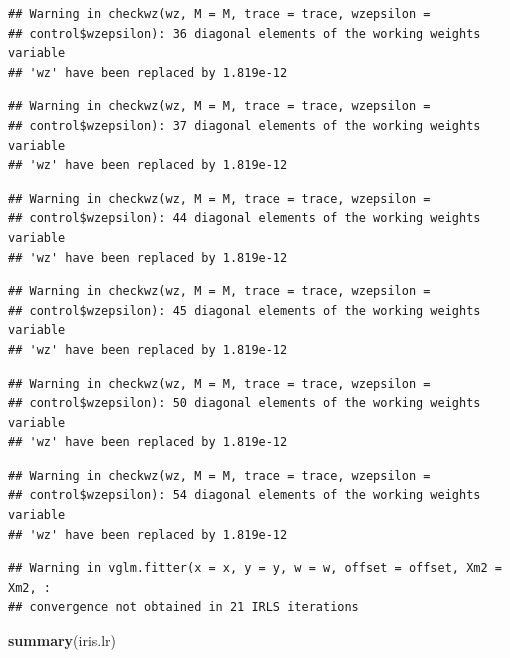 \documentclass[]{article}
\newenvironment{Shaded}{\begin{snugshade}}{\end{snugshade}}
\newcommand{\KeywordTok}[1]{\textcolor[rgb]{0.13,0.29,0.53}{\textbf{#1}}}
\newcommand{\NormalTok}[1]{#1}
\begin{document}
\begin{verbatim}
## Warning in checkwz(wz, M = M, trace = trace, wzepsilon =
## control$wzepsilon): 36 diagonal elements of the working weights variable
## 'wz' have been replaced by 1.819e-12
\end{verbatim}

\begin{verbatim}
## Warning in checkwz(wz, M = M, trace = trace, wzepsilon =
## control$wzepsilon): 37 diagonal elements of the working weights variable
## 'wz' have been replaced by 1.819e-12
\end{verbatim}

\begin{verbatim}
## Warning in checkwz(wz, M = M, trace = trace, wzepsilon =
## control$wzepsilon): 44 diagonal elements of the working weights variable
## 'wz' have been replaced by 1.819e-12
\end{verbatim}

\begin{verbatim}
## Warning in checkwz(wz, M = M, trace = trace, wzepsilon =
## control$wzepsilon): 45 diagonal elements of the working weights variable
## 'wz' have been replaced by 1.819e-12
\end{verbatim}

\begin{verbatim}
## Warning in checkwz(wz, M = M, trace = trace, wzepsilon =
## control$wzepsilon): 50 diagonal elements of the working weights variable
## 'wz' have been replaced by 1.819e-12
\end{verbatim}

\begin{verbatim}
## Warning in checkwz(wz, M = M, trace = trace, wzepsilon =
## control$wzepsilon): 54 diagonal elements of the working weights variable
## 'wz' have been replaced by 1.819e-12
\end{verbatim}

\begin{verbatim}
## Warning in vglm.fitter(x = x, y = y, w = w, offset = offset, Xm2 = Xm2, :
## convergence not obtained in 21 IRLS iterations
\end{verbatim}

\begin{Shaded}
\begin{Highlighting}[]
\KeywordTok{summary}\NormalTok{(iris.lr)}
\end{Highlighting}
\end{Shaded}
\end{document}
